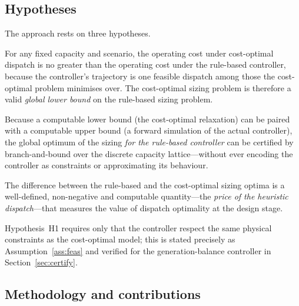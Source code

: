 \documentclass[11pt,a4paper]{article}
\theoremstyle{plain}
\theoremstyle{definition}
\begin{document}
\subsection{Hypotheses}
\label{sec:hypotheses}

The approach rests on three hypotheses.
\begin{description}[leftmargin=1.6em,style=nextline]
  \item[H1 (bounding).] For any fixed capacity and scenario, the operating cost under
  cost-optimal dispatch is no greater than the operating cost under the rule-based
  controller, because the controller's trajectory is one feasible dispatch among those the
  cost-optimal problem minimises over. The cost-optimal sizing problem is therefore a valid
  \emph{global lower bound} on the rule-based sizing problem.
  \item[H2 (certification).] Because a computable lower bound (the cost-optimal relaxation)
  can be paired with a computable upper bound (a forward simulation of the actual
  controller), the global optimum of the sizing \emph{for the rule-based controller} can be
  certified by branch-and-bound over the discrete capacity lattice---without ever encoding
  the controller as constraints or approximating its behaviour.
  \item[H3 (price of the heuristic).] The difference between the rule-based and the
  cost-optimal sizing optima is a well-defined, non-negative and computable quantity---the
  \emph{price of the heuristic dispatch}---that measures the value of dispatch optimality at
  the design stage.
\end{description}
Hypothesis~H1 requires only that the controller respect the same physical constraints as
the cost-optimal model; this is stated precisely as Assumption~\ref{ass:feas} and verified
for the generation-balance controller in Section~\ref{sec:certify}.

\subsection{Methodology and contributions}
\label{sec:method}
\end{document}
